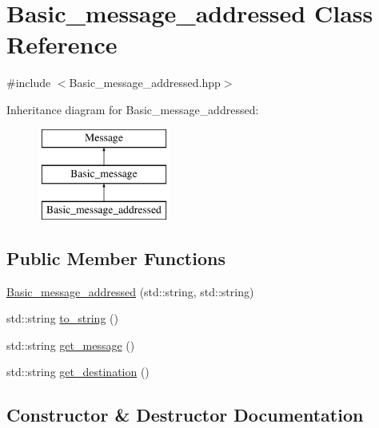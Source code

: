\hypertarget{class_basic__message__addressed}{}\section{Basic\+\_\+message\+\_\+addressed Class Reference}
\label{class_basic__message__addressed}


{\ttfamily \#include $<$Basic\+\_\+message\+\_\+addressed.\+hpp$>$}

Inheritance diagram for Basic\+\_\+message\+\_\+addressed\+:\begin{figure}[H]
\begin{center}
\leavevmode
\includegraphics[height=3.000000cm]{class_basic__message__addressed}
\end{center}
\end{figure}
\subsection*{Public Member Functions}
\begin{DoxyCompactItemize}
\item 
\hyperlink{class_basic__message__addressed_a86f2b9cef65b1f2ccae15564c777e6ec}{Basic\+\_\+message\+\_\+addressed} (std\+::string, std\+::string)
\item 
std\+::string \hyperlink{class_basic__message__addressed_a52fac87b24ea958f475ee573613fbbf0}{to\+\_\+string} ()
\item 
std\+::string \hyperlink{class_basic__message__addressed_a5baee82e6ce16d7c1efb631c9ada7189}{get\+\_\+message} ()
\item 
std\+::string \hyperlink{class_basic__message__addressed_aa6ecbe8903236c1048f84d142d68a637}{get\+\_\+destination} ()
\end{DoxyCompactItemize}


\subsection{Constructor \& Destructor Documentation}
